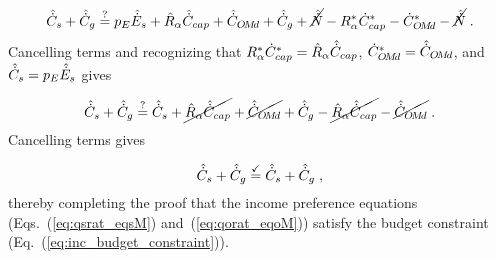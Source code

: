 \begin{equation}
  \hat{\dot{C}}_s + \hat{\dot{C}}_g \stackrel{?}{=} p_E \hat{\dot{E}}_s + \hat{R}_\alpha \hat{\dot{C}}_{cap} + \hat{\dot{C}}_{O\!M\!d} + \hat{\dot{C}}_g + \cancel{\hat{\dot{N}}}
    - {R}^*_\alpha {\dot{C}}^*_{cap} - {\dot{C}}^*_{O\!M\!d} - \cancel{\hat{\dot{N}}} \; .
\end{equation}
%
Cancelling terms and recognizing that ${R}^*_\alpha {\dot{C}}^*_{cap} = \hat{R}_\alpha \hat{\dot{C}}_{cap}$, ${\dot{C}}^*_{O\!M\!d} = \hat{\dot{C}}_{O\!M\!d}$, and
$\hat{\dot{C}}_s = p_E \hat{\dot{E}}_s$ gives

\begin{equation}
  \hat{\dot{C}}_s + \hat{\dot{C}}_g \stackrel{?}{=} \hat{\dot{C}}_s + \cancel{\hat{R}_\alpha \hat{\dot{C}}_{cap}} + \cancel{\hat{\dot{C}}_{O\!M\!d}} + \hat{\dot{C}}_g
        - \cancel{\hat{R}_\alpha \hat{\dot{C}}_{cap}} - \cancel{\hat{\dot{C}}_{O\!M\!d}} \; .
\end{equation}
%
Cancelling terms gives

\begin{equation}
  \hat{\dot{C}}_s + \hat{\dot{C}}_g \stackrel{\checkmark}{=} \hat{\dot{C}}_s + \hat{\dot{C}}_g \; ,
\end{equation}
%
thereby completing the proof that the income preference equations
(Eqs.~(\ref{eq:qsrat_eqsM}) and~(\ref{eq:qorat_eqoM}))
satisfy the budget constraint
(Eq.~(\ref{eq:inc_budget_constraint})).
